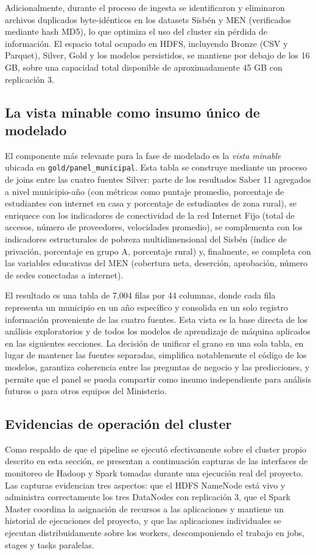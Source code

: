 Adicionalmente, durante el proceso de ingesta se identificaron y eliminaron archivos duplicados byte-idénticos en los datasets Sisbén y MEN (verificados mediante hash MD5), lo que optimiza el uso del cluster sin pérdida de información. El espacio total ocupado en HDFS, incluyendo Bronze (CSV y Parquet), Silver, Gold y los modelos persistidos, se mantiene por debajo de los 16 GB, sobre una capacidad total disponible de aproximadamente 45 GB con replicación 3.

\subsection{La vista minable como insumo único de modelado}
El componente más relevante para la fase de modelado es la \textit{vista minable} ubicada en \texttt{gold/panel\_municipal}. Esta tabla se construye mediante un proceso de joins entre las cuatro fuentes Silver: parte de los resultados Saber 11 agregados a nivel municipio-año (con métricas como puntaje promedio, porcentaje de estudiantes con internet en casa y porcentaje de estudiantes de zona rural), se enriquece con los indicadores de conectividad de la red Internet Fijo (total de accesos, número de proveedores, velocidades promedio), se complementa con los indicadores estructurales de pobreza multidimensional del Sisbén (índice de privación, porcentaje en grupo A, porcentaje rural) y, finalmente, se completa con las variables educativas del MEN (cobertura neta, deserción, aprobación, número de sedes conectadas a internet).

El resultado es una tabla de 7,004 filas por 44 columnas, donde cada fila representa un municipio en un año específico y consolida en un solo registro información proveniente de las cuatro fuentes. Esta vista es la base directa de los análisis exploratorios y de todos los modelos de aprendizaje de máquina aplicados en las siguientes secciones. La decisión de unificar el grano en una sola tabla, en lugar de mantener las fuentes separadas, simplifica notablemente el código de los modelos, garantiza coherencia entre las preguntas de negocio y las predicciones, y permite que el panel se pueda compartir como insumo independiente para análisis futuros o para otros equipos del Ministerio.

\subsection{Evidencias de operación del cluster}
Como respaldo de que el pipeline se ejecutó efectivamente sobre el cluster propio descrito en esta sección, se presentan a continuación capturas de las interfaces de monitoreo de Hadoop y Spark tomadas durante una ejecución real del proyecto. Las capturas evidencian tres aspectos: que el HDFS NameNode está vivo y administra correctamente los tres DataNodes con replicación 3, que el Spark Master coordina la asignación de recursos a las aplicaciones y mantiene un historial de ejecuciones del proyecto, y que las aplicaciones individuales se ejecutan distribuidamente sobre los workers, descomponiendo el trabajo en jobs, stages y tasks paralelas.

